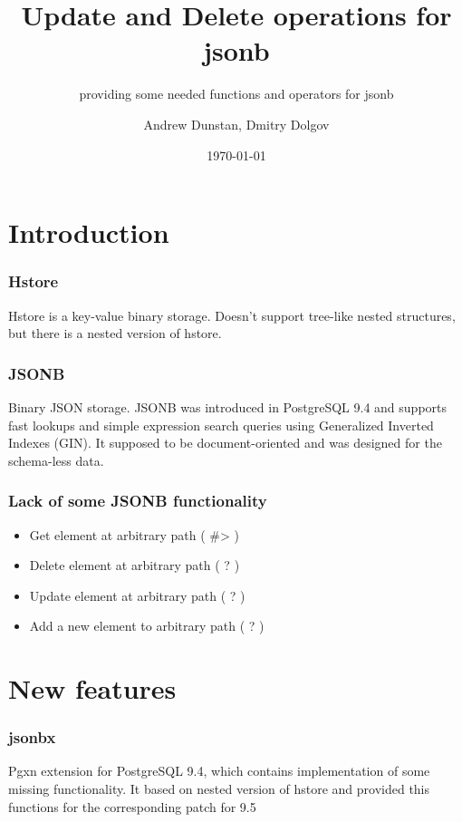 \documentclass[14pt, compress]{beamer}
\title{Update and Delete operations for jsonb}
\subtitle{providing some needed functions and operators for jsonb}
\date{\today}
\author{Andrew Dunstan, Dmitry Dolgov}
\institute{}
\begin{document}
\maketitle

\section{Introduction}

\begin{frame}[fragile]
  \frametitle{Hstore}

  Hstore is a key-value binary storage.
  Doesn't support tree-like nested structures,
  but there is a nested version of hstore.

\end{frame}

\begin{frame}[fragile]
  \frametitle{JSONB}

  Binary JSON storage. JSONB was introduced in PostgreSQL 9.4 and
  supports fast lookups and simple expression search queries using
  Generalized Inverted Indexes (GIN). It supposed to be document-oriented
  and was designed for the schema-less data.

\end{frame}

\begin{frame}[fragile]
  \frametitle{Lack of some JSONB functionality}

  \begin{itemize}
      \item[\MVRightarrow] Get element at arbitrary path ( \#> )
      \item[\MVRightarrow] Delete element at arbitrary path  ( ? )
      \item[\MVRightarrow] Update element at arbitrary path ( ? )
      \item[\MVRightarrow] Add a new element to arbitrary path ( ? )
  \end{itemize}

\end{frame}

\section{New features}

\begin{frame}[fragile]
  \frametitle{jsonbx}

  Pgxn extension for PostgreSQL 9.4, which contains implementation of
  some missing functionality. It based on nested version of hstore
  and provided this functions for the corresponding patch for 9.5

\end{frame}
\end{document}
